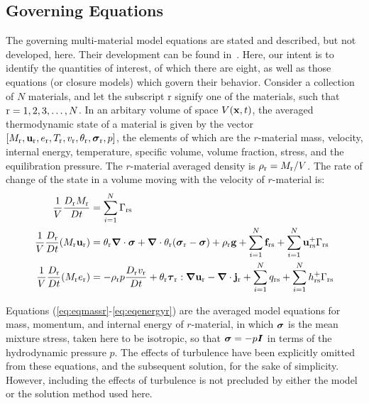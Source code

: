 \subsection{Governing Equations}\label{sec:governing_equations}
The governing multi-material model equations are stated and described, but
not developed, here.  Their development can be found in~\cite{Kashiwa2000}.
Here, our intent is to identify the quantities of interest, of which there
are eight, as well as those equations (or closure models) which govern their
behavior.  Consider a collection of $N$ materials, and let the subscript r
signify one of the materials, such that ${\rm r} = 1, 2, 3, \dots, N$.  In an
arbitary volume of space $V(\mathbf{x},t)$, the averaged thermodynamic state of a
material is given by the vector $[M_{\rm r}, \mathbf{u}_{\rm r}, e_{\rm r}, T_{\rm r}, v_{\rm r},
\theta_{\rm r}, \boldsymbol{\sigma}_{\rm r}, p]$, the elements of which are the $r$-material mass,
velocity, internal energy, temperature, specific volume, volume fraction,
stress, and the equilibration pressure.  The $r$-material averaged density is
$\rho_{\rm r} = M_{\rm r}/V$.  The rate of change of the state in a volume moving
with the velocity of $r$-material is:
\begin{align}
\frac{1}{V} \frac{D_{\rm r} M_{\rm r}}{Dt} &= \sum_{i=1}^N\Gamma_{{\rm r}{\rm s}} \label{eq:eqmassr} \\
\frac{1}{V} \frac{D_{\rm r}}{Dt} (M_{\rm r} \mathbf{u}_{\rm r}) &=
  \theta_{\rm r} \boldsymbol{\nabla}\cdot\boldsymbol{\sigma} +
  \boldsymbol{\nabla}\cdot\theta_{\rm r}(\boldsymbol{\sigma}_{\rm r} - \boldsymbol{\sigma}) + 
  \rho_{\rm r}\mathbf{g} + 
  \sum_{i=1}^N \mathbf{f}_{{\rm r}{\rm s}} + 
  \sum_{i=1}^N \mathbf{u}_{{\rm r}{\rm s}}^+ 
  \Gamma_{{\rm r}{\rm s}} \label{eq:eqmomr}\\ 
\frac{1}{V} \frac{D_{\rm r}}{Dt} (M_{\rm r} e_{\rm r}) &= -
  \rho_{\rm r} p \frac{D_{\rm r} v_{\rm r}}{ Dt} +
  \theta_{\rm r}\boldsymbol{\tau}_{\rm r}:\boldsymbol{\nabla} \mathbf{u}_{\rm r} - 
  \boldsymbol{\nabla}\cdot\mathbf{j}_{\rm r} +
  \sum_{i=1}^N q_{{\rm r}{\rm s}} +
  \sum_{i=1}^N h_{{\rm r}{\rm s}}^+ 
  \Gamma_{{\rm r}{\rm s}} \label{eq:eqenergyr}
\end{align}

Equations (\ref{eq:eqmassr}-\ref{eq:eqenergyr}) are the averaged model equations
for mass, momentum, and internal energy of $r$-material, in which $\boldsymbol{\sigma}$ is
the mean mixture stress, taken here to be isotropic, so that $\boldsymbol{\sigma} = -p\boldsymbol{I}$
in terms of the hydrodynamic pressure $p$.  The effects of turbulence have
been explicitly omitted from these equations, and the subsequent solution,
for the sake of simplicity.  However, including the effects of turbulence
is not precluded by either the model or the solution method used here.

